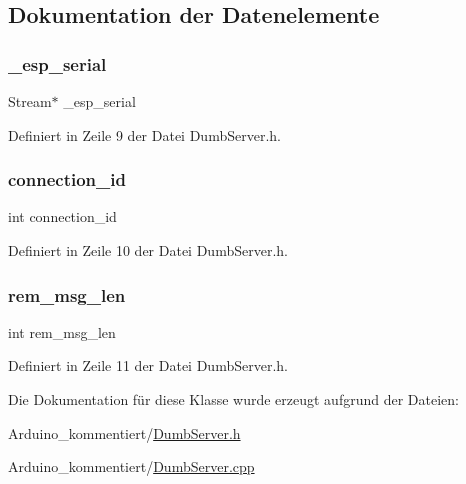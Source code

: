 \subsection{Dokumentation der Datenelemente}
\mbox{\label{class_esp_server_a552aab874ad99b696f4c997d6f5a4746}} 
\subsubsection{\texorpdfstring{\+\_\+esp\+\_\+serial}{\_esp\_serial}}
{\footnotesize\ttfamily Stream$\ast$ \+\_\+esp\+\_\+serial\hspace{0.3cm}{\ttfamily [private]}}



Definiert in Zeile 9 der Datei Dumb\+Server.\+h.

\mbox{\label{class_esp_server_a821bd4e05f0b260cc584a2d23bda0fff}} 
\subsubsection{\texorpdfstring{connection\+\_\+id}{connection\_id}}
{\footnotesize\ttfamily int connection\+\_\+id\hspace{0.3cm}{\ttfamily [private]}}



Definiert in Zeile 10 der Datei Dumb\+Server.\+h.

\mbox{\label{class_esp_server_a34a62d83c82a13f441af983f9b212e25}} 
\subsubsection{\texorpdfstring{rem\+\_\+msg\+\_\+len}{rem\_msg\_len}}
{\footnotesize\ttfamily int rem\+\_\+msg\+\_\+len\hspace{0.3cm}{\ttfamily [private]}}



Definiert in Zeile 11 der Datei Dumb\+Server.\+h.



Die Dokumentation für diese Klasse wurde erzeugt aufgrund der Dateien\+:\begin{DoxyCompactItemize}
\item 
Arduino\+\_\+kommentiert/\hyperlink{_dumb_server_8h}{Dumb\+Server.\+h}\item 
Arduino\+\_\+kommentiert/\hyperlink{_dumb_server_8cpp}{Dumb\+Server.\+cpp}\end{DoxyCompactItemize}
